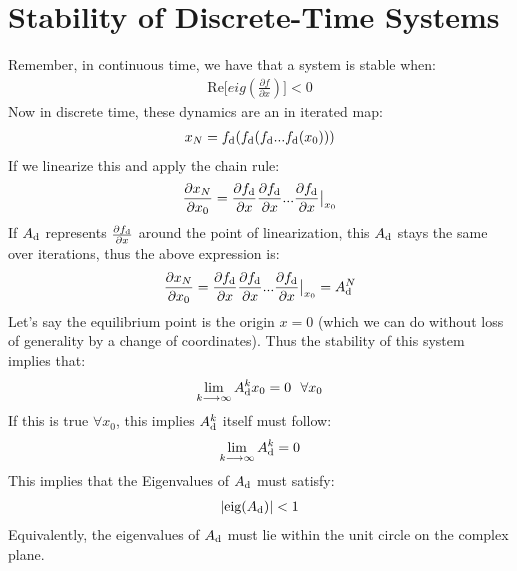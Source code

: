 \section{Stability of Discrete-Time Systems}
Remember, in continuous time, we have that a system is stable when: 
\begin{align}
    \textrm{Re} \big[ eig ( \frac{\partial f}{\partial x} ) \big] < 0 
\end{align}
Now in discrete time, these dynamics are an in iterated map: 
\begin{align}
    x_{N} = f_{\rm d} ( f_{\rm d} ( f_{\rm d} ... f_{\rm d} (x_0)))
\end{align}
If we linearize this and apply the chain rule: 
\begin{align}
    \frac{\partial x_N}{\partial x_0} = \frac{\partial f_{\rm d}}{\partial x} \frac{\partial f_{\rm d}}{\partial x} ... \evalat{\frac{\partial f_{\rm d}}{\partial x}}{x_0}
\end{align}
If $A_{\rm d}$ represents $\frac{\partial f_{\rm d}}{\partial x}$ around the point of linearization, this $A_{\rm d}$ stays the same over iterations, thus the above expression is: 
\begin{align}
    \frac{\partial x_N}{\partial x_0} = \frac{\partial f_{\rm d}}{\partial x} \frac{\partial f_{\rm d}}{\partial x} ... \evalat{\frac{\partial f_{\rm d}}{\partial x}}{x_0} = A_{\rm d}^N
\end{align}
Let's say the equilibrium point is the origin $x=0$ (which we can do without loss of generality by a change of coordinates). Thus the stability of this system implies that:
\begin{align}
    \lim_{k \longrightarrow \infty} A_{\rm d}^k x_0 = 0 \ \ \forall x_0
\end{align}
If this is true $\forall x_0$, this implies $A_{\rm d}^k$ itself must follow: 
\begin{align}
    \lim_{k \longrightarrow \infty} A_{\rm d}^k = 0
\end{align}
This implies that the Eigenvalues of $A_{\rm d}$ must satisfy: 
\begin{align}
    | \textrm{eig} ( A_{\rm d})  | < 1 
\end{align}
Equivalently, the eigenvalues of $A_{\rm d}$ must lie within the unit circle on the complex plane.


